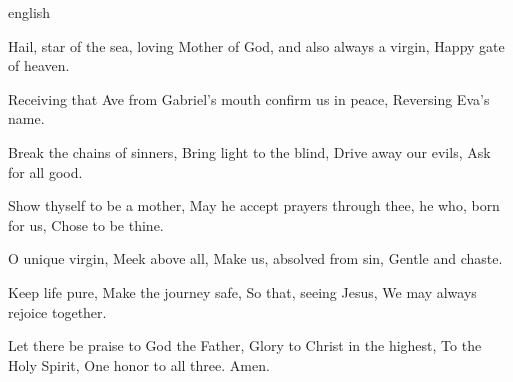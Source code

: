 

{english}
{Hail, star of the sea,
loving Mother of God,
and also always a virgin,
Happy gate of heaven.

 Receiving that Ave
from Gabriel's mouth
confirm us in peace,
Reversing Eva's name.

 Break the chains of sinners,
Bring light to the blind,
Drive away our evils,
Ask for all good.

 Show thyself to be a mother,
May he accept prayers through thee,
he who, born for us,
Chose to be thine.

 O unique virgin,
Meek above all,
Make us, absolved from sin,
Gentle and chaste.

 Keep life pure,
Make the journey safe,
So that, seeing Jesus,
We may always rejoice together.

 Let there be praise to God the Father,
Glory to Christ in the highest,
To the Holy Spirit,
One honor to all three. Amen.}